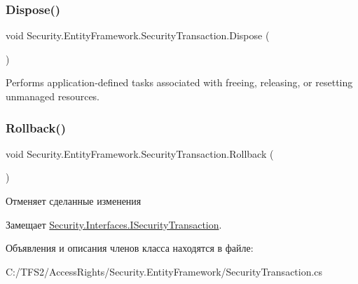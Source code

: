 \subsubsection{\texorpdfstring{Dispose()}{Dispose()}}
{\footnotesize\ttfamily void Security.\+Entity\+Framework.\+Security\+Transaction.\+Dispose (\begin{DoxyParamCaption}{ }\end{DoxyParamCaption})}



Performs application-\/defined tasks associated with freeing, releasing, or resetting unmanaged resources. 

\mbox{\label{class_security_1_1_entity_framework_1_1_security_transaction_a926ab5cfb24bab1a1e5ef2e057f12230}} 
\subsubsection{\texorpdfstring{Rollback()}{Rollback()}}
{\footnotesize\ttfamily void Security.\+Entity\+Framework.\+Security\+Transaction.\+Rollback (\begin{DoxyParamCaption}{ }\end{DoxyParamCaption})}



Отменяет сделанные изменения 



Замещает \hyperlink{interface_security_1_1_interfaces_1_1_i_security_transaction_afc9cfbc152639e831a753cad4e62b9d9}{Security.\+Interfaces.\+I\+Security\+Transaction}.



Объявления и описания членов класса находятся в файле\+:\begin{DoxyCompactItemize}
\item 
C\+:/\+T\+F\+S2/\+Access\+Rights/\+Security.\+Entity\+Framework/Security\+Transaction.\+cs\end{DoxyCompactItemize}
